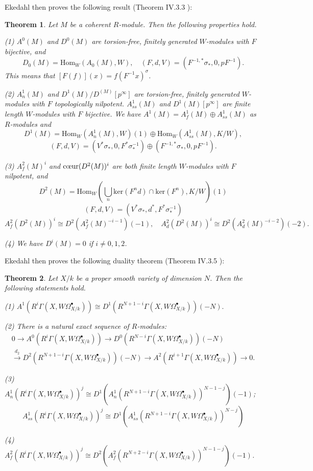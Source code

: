 \documentclass[a4paper,12pt,twoside]{report}
\newtheorem{theorem}{Theorem}[section]
\newcommand{\Hom}{\mathrm{Hom}}
\begin{document}
Ekedahl then proves the following result (Theorem IV.3.3 \cite{Ek1}): 

\begin{theorem} Let $M$ be a coherent $R$-module. Then the following properties hold.

    {\rm (1)} $A^0(M)$ and $D^0(M)$ are torsion-free, finitely generated $W$-modules with $F$ bijective, and 
    \[D_0(M)=\Hom_W(A_0(M),W),\quad (F,d,V)=(F^{-1,*}\sigma_*,0,pF^{-1}).\]
    This means that $[F(f)](x)=f(F^{-1}x)^\sigma$. 

    {\rm (2)} $A^1_n(M)$ and $D^1(M)/D^(M)[p^\infty]$ are torsion-free, 
    finitely generated $W$-modules with $F$ topologically nilpotent. 
    $A^1_{ss}(M)$ and $D^1(M)[p^\infty]$ are finite length $W$-modules with $F$ bijective. 
We have $A^1(M)=A^1_f(M)\oplus A^1_{ss}(M)$ as $R$-modules and 
    \[D^1(M)=\Hom_W(A^1_n(M),W)(1)\oplus \Hom_W(A^1_{ss}(M),K/W),\]
    \[(F,d,V)=(V^*\sigma_*,0,F^*\sigma^{-1}_*)\oplus (F^{-1,*}\sigma_*,0,pF^{-1}).\]

    {\rm (3)} $A^2_f(M)^i$ and $\text{\rm {c\oe ur}}(D^2(M))^i$ are both finite length $W$-modules 
    with $F$ nilpotent, and 
    \[D^2(M)=\Hom_W(\bigcup_n \mathrm{ker}(F^nd)\cap \mathrm{ker}(F^n),K/W)(1)\]
    \[(F,d,V)=(V^*\sigma_*,d^*,F^*\sigma^{-1}_{*})\]
    \[A^2_f(D^2(M))^i\cong D^2(A^2_f(M)^{-i-1})(-1), \quad
   A^2_d(D^2(M))^i\cong D^2(A^2_d(M)^{-i-2})(-2).\]

    {\rm (4)} We have $D^i(M)=0$ if $i\neq 0,1,2$. 
\end{theorem}

Ekedahl then proves the following duality theorem (Theorem IV.3.5 \cite{Ek1}): 

\begin{theorem}\label{Ekeduality}
    Let $X/k$ be a proper smooth variety of dimension $N$. Then the following statements hold.
    
{\rm (1)} $A^1(R^i\Gamma(X,W\Omega^\bullet_{X/k}))\cong D^1(R^{N+1-i}\Gamma(X,W\Omega^\bullet_{X/k}))(-N).$ 

{\rm (2)} There is a natural exact sequence of $R$-modules: 
\[\begin{aligned}
    0\rightarrow A^0(R^i\Gamma(X,W\Omega_{X/k}^\bullet))\rightarrow D^0(R^{N-i}\Gamma(X,W\Omega_{X/k}^\bullet))(-N) \\
    \xrightarrow{d_2} D^2(R^{N+1-i}\Gamma(X,W\Omega^\bullet_{X/k}))(-N) 
\rightarrow A^2(R^{i+1}\Gamma(X,W\Omega^\bullet_{X/k})) \rightarrow 0.
\end{aligned}\]

{\rm (3)} $A^1_n(R^i\Gamma(X,W\Omega_{X/k}^\bullet))^j\cong D^1(A^1_n(R^{N+1-i}\Gamma(X,W\Omega_{X/k}^\bullet))^{N-1-j})(-1)$;
\[A^1_{ss}(R^i\Gamma(X,W\Omega_{X/k}^\bullet))^j\cong D^1(A^1_{ss}(R^{N+1-i}\Gamma(X,W\Omega_{X/k}^\bullet))^{N-j})\]

{\rm (4)} 
$A^2_{f}(R^i\Gamma(X,W\Omega_{X/k}^\bullet))^j\cong D^2(A^2_{f}(R^{N+2-i}\Gamma(X,W\Omega_{X/k}^\bullet))^{N-1-j})(-1)$.

\end{theorem}
\end{document}
